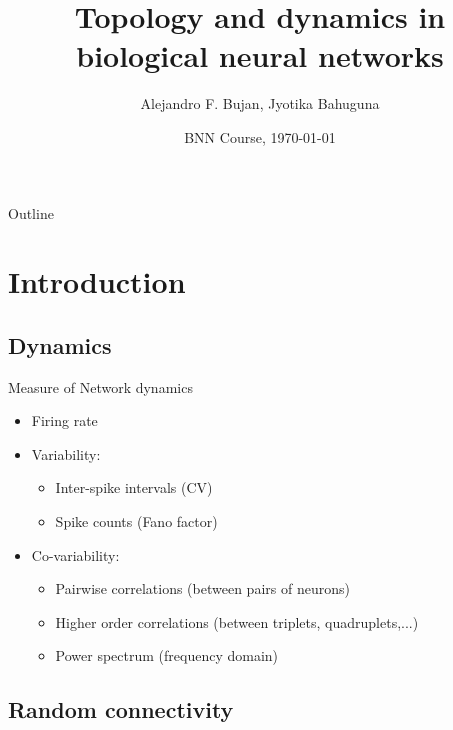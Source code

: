 \documentclass[fleqn]{beamer}
\title[Topology and dynamics in biological neural networks]{Topology and
dynamics in biological neural networks}
\author[Alejandro F. Bujan]{Alejandro F. Bujan, Jyotika Bahuguna}
\date[]{BNN Course, \today}
\newcommand{\pc}[1]{\setcounter{page}{#1}}
\newcommand{\ppc}[1]{\pause\setcounter{page}{#1}}
\begin{document}
\begin{frame}
  \titlepage
\end{frame}

{
\begin{frame}{Outline}
  \footnotesize
  \tableofcontents
  \normalsize
\end{frame}
}

\setcounter{page}{0}

\section{Introduction}





\subsection{Dynamics}
\begin{frame}{Measure of Network dynamics}
  \begin{itemize}
      \item   Firing rate\ppc{2}
      \item  Variability:\ppc{2}
      \begin{itemize}
      \item  Inter-spike intervals (CV)\ppc{2}
      \item  Spike counts (Fano factor)\ppc{2}
      \end{itemize}
      \item  Co-variability:\ppc{2}
	\begin{itemize}
	  \item Pairwise correlations (between pairs of neurons)\ppc{2}
	  \item Higher order correlations (between triplets,
quadruplets,...)\ppc{2}
	  \item Power spectrum (frequency domain)
	\end{itemize}
      \end{itemize}
\end{frame}

\subsection{Random connectivity}

\pc{3}
\end{document}

